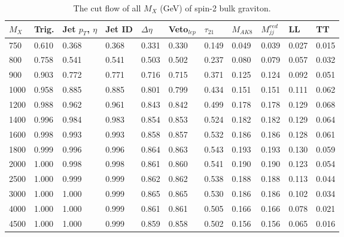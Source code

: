 \begin{table}[h!]
  \begin{center}
    \begin{tabular}{lllllllllll}
    $M_X$ & Trig. & Jet $p_T$, $\eta$ & Jet ID & $\Delta \eta$ & Veto$_{lep}$ & $\tau _{21}$ & $M_{AK8}$ & $M^{red}_{jj}$ & LL & TT\\
    \hline
    750 & 0.610 & 0.368 & 0.368 & 0.331 & 0.330 & 0.149 & 0.049 & 0.039 & 0.027 & 0.015 \\
	800 & 0.758 & 0.541 & 0.541 & 0.503 & 0.502 & 0.237 & 0.080 & 0.079 & 0.057 & 0.032 \\
	900 & 0.903 & 0.772 & 0.771 & 0.716 & 0.715 & 0.371 & 0.125 & 0.124 & 0.092 & 0.051 \\
	1000 & 0.958 & 0.885 & 0.885 & 0.801 & 0.799 & 0.434 & 0.151 & 0.151 & 0.111 & 0.062 \\
1200 & 0.988 & 0.962 & 0.961 & 0.843 & 0.842 & 0.499 & 0.178 & 0.178 & 0.129 & 0.068 \\
1400 & 0.996 & 0.984 & 0.983 & 0.854 & 0.853 & 0.524 & 0.182 & 0.182 & 0.129 & 0.064 \\
1600 & 0.998 & 0.993 & 0.993 & 0.858 & 0.857 & 0.532 & 0.186 & 0.186 & 0.128 & 0.061 \\
1800 & 0.999 & 0.996 & 0.996 & 0.864 & 0.863 & 0.543 & 0.193 & 0.193 & 0.130 & 0.059 \\
2000 & 1.000 & 0.998 & 0.998 & 0.861 & 0.860 & 0.541 & 0.190 & 0.190 & 0.123 & 0.054 \\
2500 & 1.000 & 0.999 & 0.999 & 0.862 & 0.862 & 0.538 & 0.188 & 0.188 & 0.113 & 0.044 \\
3000 & 1.000 & 1.000 & 0.999 & 0.865 & 0.865 & 0.530 & 0.186 & 0.186 & 0.102 & 0.034 \\
4000 & 1.000 & 1.000 & 0.999 & 0.861 & 0.861 & 0.505 & 0.166 & 0.166 & 0.078 & 0.021 \\
4500 & 1.000 & 1.000 & 0.999 & 0.859 & 0.858 & 0.502 & 0.156 & 0.156 & 0.065 & 0.016 \\
\hline
    \end{tabular}
  \end{center}
	
  \caption{The cut flow of all $M_X$ (GeV) of spin-2 bulk graviton.}
\end{table} 



